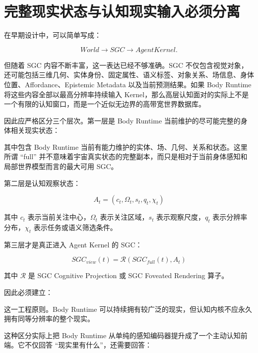 \section{完整现实状态与认知现实输入必须分离}

在早期设计中，可以简单写成：

\[
World
\rightarrow
SGC
\rightarrow
AgentKernel.
\]

但随着 SGC 内容不断丰富，这一表达已经不够准确。SGC 不仅包含视觉对象，还可能包括三维几何、实体身份、固定属性、语义标签、对象关系、场信息、身体位置、Affordance、Epistemic Metadata 以及当前预测结果。如果 Body Runtime 将这些内容全部以最高分辨率持续输入 Kernel，那么高层认知面对的实际上不是一个有限的认知窗口，而是一个近似无边界的高带宽世界数据库。

因此应严格区分三个层次。第一层是 Body Runtime 当前维护的尽可能完整的身体相关现实状态：

\begin{statementbox}
\centering
{}
\end{statementbox}

其中包含 Body Runtime 当前有能力维护的实体、场、几何、关系和状态。这里所谓 ``full'' 并不意味着宇宙真实状态的完整副本，而只是相对于当前身体感知和局部世界模型而言的最大可用 SGC。

第二层是认知观察状态：

\[
\boxed{
A_t=
(c_t,\Omega_t,s_t,q_t,\chi_t)
}
\]

其中 $c_t$ 表示当前关注中心，$\Omega_t$ 表示关注区域，$s_t$ 表示观察尺度，$q_t$ 表示分辨率分布，$\chi_t$ 表示任务或语义筛选条件。

第三层才是真正进入 Agent Kernel 的 SGC：

\[
\boxed{
SGC_{view}(t)
=
\mathcal R
\left(
SGC_{full}(t),A_t
\right)
}
\]

其中 $\mathcal R$ 是 SGC Cognitive Projection 或 SGC Foveated Rendering 算子。

因此必须建立：

\begin{statementbox}
\centering
{}
\end{statementbox}

这一工程原则。Body Runtime 可以持续拥有较广泛的现实，但认知内核不应永久拥有同等分辨率的整个现实。

这种区分实际上把 Body Runtime 从单纯的感知编码器提升成了一个主动认知前端。它不仅回答 ``现实里有什么''，还需要回答：

